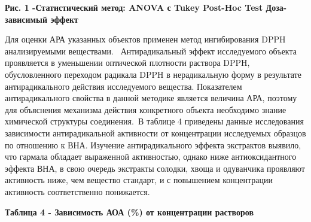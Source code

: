 {\bfseries Рис. 1 -Статистический метод: ANOVA с Tukey Post-Hoc Test
Доза-зависимый эффект}

Для оценки АРА указанных объектов применен метод ингибирования DPPH
анализируемыми веществами.~ Антирадикальный эффект исследуемого объекта
проявляется в уменьшении оптической плотности раствора DPPH,
обусловленного переходом радикала DPPH в нерадикальную форму в
результате антирадикального действия исследуемого вещества. Показателем
антирадикального свойства в данной методике является величина АРА,
поэтому для объяснения механизма действия конкретного объекта необходимо
знание химической структуры соединения.~В таблице 4 приведены данные
исследования зависимости антирадикальной активности от концентрации
исследуемых образцов по отношению к ВНА. Изучение антирадикального
эффекта экстрактов выявило, что гармала обладает выраженной активностью,
однако ниже антиоксидантного эффекта ВНА, в свою очередь экстракты
солодки, хвоща и одуванчика проявляют активность ниже, чем вещество
стандарт, и с повышением концентрации активность соответственно
понижается.

{\bfseries Таблица 4 - Зависимость АОА (\%) от концентрации растворов}



